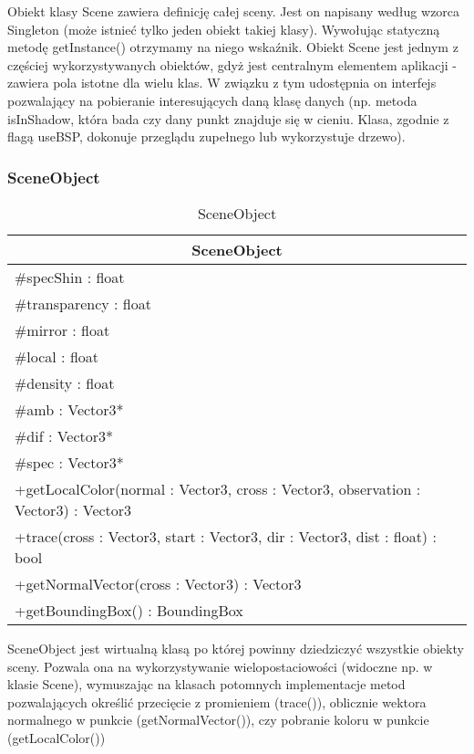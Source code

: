 Obiekt klasy Scene zawiera definicję całej sceny. Jest on napisany według wzorca Singleton (może istnieć tylko jeden obiekt takiej klasy). Wywołując statyczną metodę getInstance() otrzymamy na niego wskaźnik. Obiekt Scene jest jednym z częściej wykorzystywanych obiektów, gdyż jest centralnym elementem aplikacji - zawiera pola istotne dla wielu klas. W związku z tym udostępnia on interfejs pozwalający na pobieranie interesujących daną klasę danych (np. metoda isInShadow, która bada czy dany punkt znajduje się w cieniu. Klasa, zgodnie z flagą useBSP, dokonuje przeglądu zupełnego lub wykorzystuje drzewo).

\subsubsection{SceneObject}

\footnotesize
\begin{longtable}{|p{14cm}|}
    \caption{SceneObject} \label{tab:SceneObject} \\ \hline
    \multicolumn{1}{|c|}{SceneObject} \\ \hline
    \#specShin : float \\
    \#transparency : float \\
    \#mirror : float \\
    \#local : float \\
    \#density : float \\
    \#amb : Vector3* \\
    \#dif : Vector3* \\
    \#spec : Vector3* \\
    \hline
	+getLocalColor(normal : Vector3, cross : Vector3, observation : Vector3) : Vector3 \\
	+trace(cross : Vector3, start : Vector3, dir : Vector3, dist : float) : bool \\
	+getNormalVector(cross : Vector3) : Vector3 \\
	+getBoundingBox() : BoundingBox \\
	\hline
\end{longtable}
\normalsize

SceneObject jest wirtualną klasą po której powinny dziedziczyć wszystkie obiekty sceny. Pozwala ona na wykorzystywanie wielopostaciowości (widoczne np. w klasie Scene), wymuszając na klasach potomnych implementacje metod pozwalających określić przecięcie z promieniem (trace()), oblicznie wektora normalnego w punkcie (getNormalVector()), czy pobranie koloru w punkcie (getLocalColor())

